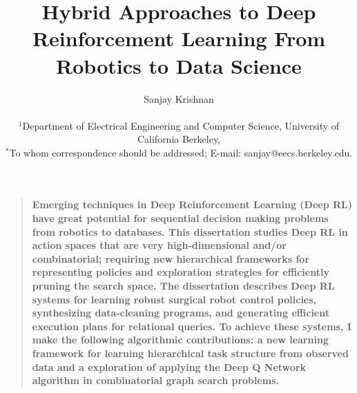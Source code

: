 \documentclass[11pt]{book}
\title{Hybrid Approaches to Deep Reinforcement Learning From Robotics to Data Science}
\author
{Sanjay Krishnan\\
\\
\normalsize{$^{1}$Department of Electrical Engineering and Computer Science, University of California Berkeley,}\\
\normalsize{$^\ast$To whom correspondence should be addressed; E-mail:  sanjay@eecs.berkeley.edu.}
}
\date{}
\newenvironment{sciabstract}{%
\begin{quote} \bf}
{\end{quote}}
\begin{document}
 


\baselineskip26pt


\maketitle 





\begin{sciabstract}
Emerging techniques in Deep Reinforcement
Learning (Deep RL) have great potential for sequential decision making problems from robotics to databases. This dissertation studies Deep RL in action spaces that are very high-dimensional and/or combinatorial; requiring new hierarchical frameworks for representing policies and exploration strategies for efficiently pruning the search space. The dissertation describes  Deep RL systems for learning robust surgical robot control policies, synthesizing data-cleaning programs, and generating efficient execution plans for relational queries. To achieve these systems, I make the following algorithmic contributions: a new learning framework for learning hierarchical task structure from observed data and a exploration of applying the Deep Q Network algorithm in combinatorial graph search problems.
\end{sciabstract}


\clearpage

\tableofcontents

\clearpage


\end{document}
